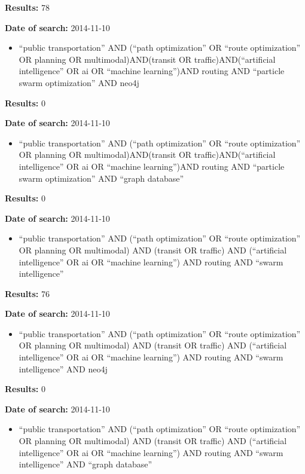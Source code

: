 \par \textbf{Results:} 78
\par \textbf{Date of search:} 2014-11-10
\begin{itemize}
	\item ``public transportation'' AND (``path optimization'' OR ``route optimization'' OR planning OR multimodal)AND(transit OR traffic)AND(``artificial intelligence'' OR ai OR ``machine learning'')AND routing AND ``particle swarm optimization'' AND neo4j
\end{itemize}
\par \textbf{Results:} 0
\par \textbf{Date of search:} 2014-11-10
\begin{itemize}
	\item ``public transportation'' AND (``path optimization'' OR ``route optimization'' OR planning OR multimodal)AND(transit OR traffic)AND(``artificial intelligence'' OR ai OR ``machine learning'')AND routing AND ``particle swarm optimization'' AND ``graph database''
\end{itemize}
\par \textbf{Results:} 0
\par \textbf{Date of search:} 2014-11-10
\begin{itemize}
	\item ``public transportation'' AND (``path optimization'' OR ``route optimization'' OR planning OR multimodal)  AND (transit OR traffic) AND (``artificial intelligence'' OR ai OR ``machine learning'') AND routing AND ``swarm intelligence''
\end{itemize}
\par \textbf{Results:} 76
\par \textbf{Date of search:} 2014-11-10
\begin{itemize}
	\item ``public transportation'' AND (``path optimization'' OR ``route optimization'' OR planning OR multimodal)  AND (transit OR traffic) AND (``artificial intelligence'' OR ai OR ``machine learning'') AND routing AND ``swarm intelligence'' AND neo4j
\end{itemize}
\par \textbf{Results:} 0
\par \textbf{Date of search:} 2014-11-10
\begin{itemize}
	\item ``public transportation'' AND (``path optimization'' OR ``route optimization'' OR planning OR multimodal)  AND (transit OR traffic) AND (``artificial intelligence'' OR ai OR ``machine learning'') AND routing AND ``swarm intelligence'' AND ``graph database''
\end{itemize}

